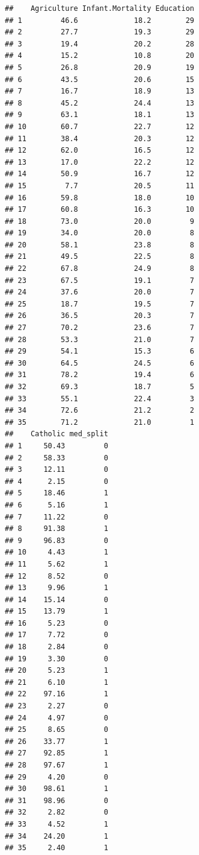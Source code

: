 \documentclass[
]{book}
\begin{document}
\begin{verbatim}
##    Agriculture Infant.Mortality Education
## 1         46.6             18.2        29
## 2         27.7             19.3        29
## 3         19.4             20.2        28
## 4         15.2             10.8        20
## 5         26.8             20.9        19
## 6         43.5             20.6        15
## 7         16.7             18.9        13
## 8         45.2             24.4        13
## 9         63.1             18.1        13
## 10        60.7             22.7        12
## 11        38.4             20.3        12
## 12        62.0             16.5        12
## 13        17.0             22.2        12
## 14        50.9             16.7        12
## 15         7.7             20.5        11
## 16        59.8             18.0        10
## 17        60.8             16.3        10
## 18        73.0             20.0         9
## 19        34.0             20.0         8
## 20        58.1             23.8         8
## 21        49.5             22.5         8
## 22        67.8             24.9         8
## 23        67.5             19.1         7
## 24        37.6             20.0         7
## 25        18.7             19.5         7
## 26        36.5             20.3         7
## 27        70.2             23.6         7
## 28        53.3             21.0         7
## 29        54.1             15.3         6
## 30        64.5             24.5         6
## 31        78.2             19.4         6
## 32        69.3             18.7         5
## 33        55.1             22.4         3
## 34        72.6             21.2         2
## 35        71.2             21.0         1
##    Catholic med_split
## 1     50.43         0
## 2     58.33         0
## 3     12.11         0
## 4      2.15         0
## 5     18.46         1
## 6      5.16         1
## 7     11.22         0
## 8     91.38         1
## 9     96.83         0
## 10     4.43         1
## 11     5.62         1
## 12     8.52         0
## 13     9.96         1
## 14    15.14         0
## 15    13.79         1
## 16     5.23         0
## 17     7.72         0
## 18     2.84         0
## 19     3.30         0
## 20     5.23         1
## 21     6.10         1
## 22    97.16         1
## 23     2.27         0
## 24     4.97         0
## 25     8.65         0
## 26    33.77         1
## 27    92.85         1
## 28    97.67         1
## 29     4.20         0
## 30    98.61         1
## 31    98.96         0
## 32     2.82         0
## 33     4.52         1
## 34    24.20         1
## 35     2.40         1
\end{verbatim}
\end{document}
